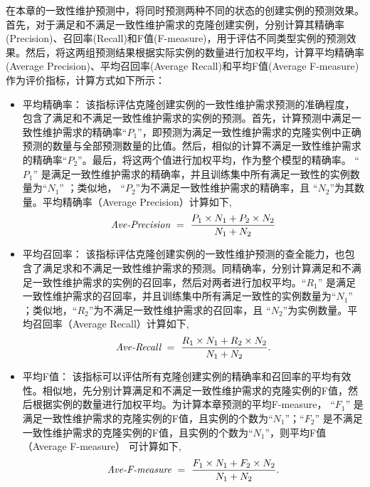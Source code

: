 在本章的一致性维护预测中，将同时预测两种不同的状态的创建实例的预测效果。首先，对于满足和不满足一致性维护需求的克隆创建实例，分别计算其精确率(Precision)、召回率(Recall)和F值(F-measure)，用于评估不同类型实例的预测效果。然后，将这两组预测结果根据实际实例的数量进行加权平均，计算平均精确率(Average Precision)、平均召回率(Average Recall)和平均F值(Average F-measure)作为评价指标，计算方式如下所示：
\begin{itemize}
\item
平均精确率：
 该指标评估克隆创建实例的一致性维护需求预测的准确程度，包含了满足和不满足一致性维护需求的实例的预测。首先，计算预测中满足一致性维护需求的精确率``$P_1$''，即预测为满足一致性维护需求的克隆实例中正确预测的数量与全部预测数量的比值。然后，相似的计算不满足一致性维护需求的精确率``$P_2$''。最后，将这两个值进行加权平均，作为整个模型的精确率。 ``$P_1$'' 是满足一致性维护需求的精确率，并且训练集中所有满足一致性的实例数量为``$N_1$'' ；类似地， ``$P_2$''为不满足一致性维护需求的精确率，且 ``$N_2$''为其数量。平均精确率（Average Precision）计算如下,
\begin{equation} 
\mbox{\it Ave-Precision} ~=~ {\frac {P_1 \times N_1 + P_2 \times N_2}{N_1 + N_2}}
\end{equation}
\item
平均召回率：
该指标评估克隆创建实例的一致性维护预测的查全能力，也包含了满足求和不满足一致性维护需求的预测。同精确率，分别计算满足和不满足一致性维护需求的实例的召回率，然后对两者进行加权平均。“$R_1$” 是满足一致性维护需求的召回率，并且训练集中所有满足一致性的实例数量为“$N_1$” ；类似地，“$R_2$”为不满足一致性维护需求的召回率，且 “$N_2$”为实例数量。平均召回率（Average Recall）计算如下,
\begin{equation} 
\mbox{\it Ave-Recall} ~=~ {\frac  {R_1 \times N_1 + R_2 \times N_2}{N_1 + N_2}}.
\end{equation}

\item
平均F值：
该指标可以评估所有克隆创建实例的精确率和召回率的平均有效性。相似地，先分别计算满足和不满足一致性维护需求的克隆实例的F值，然后根据实例的数量进行加权平均。为计算本章预测的平均F-measure， ``$F_1$'' 是满足一致性维护需求的克隆实例的F值，且实例的个数为``$N_1$''；``$F_2$'' 是不满足一致性维护需求的克隆实例的F值，且实例的个数为``$N_1$''，则平均F值（Average F-measure） 可计算如下,
\begin{equation} 
\mbox{\it Ave-F-measure} ~=~ {\frac  {F_1 \times N_1 + F_2 \times N_2}{N_1 + N_2}}.
\end{equation}
\end{itemize}

